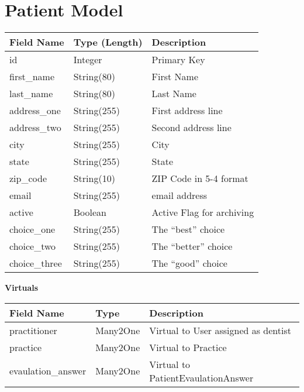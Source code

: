 \documentclass[letterpaper,10pt,english]{sphinxmanual}
\begin{document}
\section{Patient Model}
\label{dev-models:patient-model-label}\label{dev-models:patient-model}
\begin{tabulary}{\linewidth}{|L|L|L|}
\hline
\textsf{\relax 
Field Name
} & \textsf{\relax 
Type (Length)
} & \textsf{\relax 
Description
}\\
\hline
id
 & 
Integer
 & 
Primary Key
\\

first\_name
 & 
String(80)
 & 
First Name
\\

last\_name
 & 
String(80)
 & 
Last Name
\\

address\_one
 & 
String(255)
 & 
First address line
\\

address\_two
 & 
String(255)
 & 
Second address line
\\

city
 & 
String(255)
 & 
City
\\

state
 & 
String(255)
 & 
State
\\

zip\_code
 & 
String(10)
 & 
ZIP Code in 5-4 format
\\

email
 & 
String(255)
 & 
email address
\\

active
 & 
Boolean
 & 
Active Flag for archiving
\\

choice\_one
 & 
String(255)
 & 
The ``best'' choice
\\

choice\_two
 & 
String(255)
 & 
The ``better'' choice
\\

choice\_three
 & 
String(255)
 & 
The ``good'' choice
\\
\hline\end{tabulary}


\textbf{Virtuals}

\begin{tabulary}{\linewidth}{|L|L|L|}
\hline
\textsf{\relax 
Field Name
} & \textsf{\relax 
Type
} & \textsf{\relax 
Description
}\\
\hline
practitioner
 & 
Many2One
 & 
Virtual to User assigned as dentist
\\

practice
 & 
Many2One
 & 
Virtual to Practice
\\

evaulation\_answer
 & 
Many2One
 & 
Virtual to PatientEvaulationAnswer
\\
\hline\end{tabulary}
\end{document}
